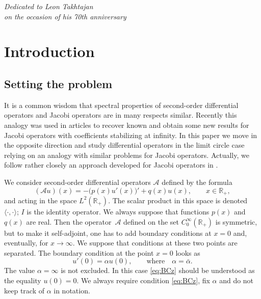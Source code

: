 \documentclass[pdftex]{sigma}%
\numberwithin{equation}{section}
\begin{document}
\begin{flushright}
\begin{minipage}{65mm}
\it Dedicated to Leon Takhtajan\\ on the occasion of his 70th anniversary
\end{minipage}
\end{flushright}

\renewcommand{\thefootnote}{\arabic{footnote}}
\setcounter{footnote}{0}

\section{Introduction}

\subsection{Setting the problem}

It is a common wisdom that spectral properties of second-order differential operators and Jacobi operators are in many respects similar. Recently this analogy was used in articles \cite{Y/LD, JLR} to recover known and obtain some new results for
Jacobi operators with coefficients stabilizing at infinity. In this paper we move in the opposite direction and study
differential operators in the limit circle case relying on an analogy with similar problems for Jacobi operators.
Actually, we follow rather closely an approach developed for Jacobi operators in \cite{Jacobi-LC}.

We consider second-order differential operators ${\mathcal A}$ defined by the formula
 \begin{equation}
( {\mathcal A} u)(x)=- \big(p(x) u' (x)\big)' + q(x) u(x) ,\qquad x\in {\mathbb R}_{+},
 \label{eq:ZP+}\end{equation}
 and acting in
 the space $L^2 ({\mathbb R}_{+})$. The scalar product in this space is denoted $\langle \cdot, \cdot\rangle$; $I$ is the identity operator. We always suppose that functions $p(x)$ and $q(x)$ are real. Then the opera\-tor~${\mathcal A}$ defined on the set $ C_{0} ^\infty ({\mathbb R}_{+}) $ is symmetric, but to make it self-adjoint, one has to add boundary conditions at $x=0$ and, eventually, for $x\to\infty$. We suppose that conditions at these two points are separated. The boundary condition at the point $x=0$ looks as
 \begin{equation} \label{eq:BCz}
u'(0)= \alpha u(0), \qquad\mbox{where}\quad \alpha =\bar{\alpha}.
 \end{equation}
 The value $\alpha=\infty$ is not excluded. In this case \eqref{eq:BCz} should be understood as the equality $u(0)=0$. We always require condition \eqref{eq:BCz}, fix $\alpha$ and do not keep track of $\alpha$ in notation.
\end{document}

